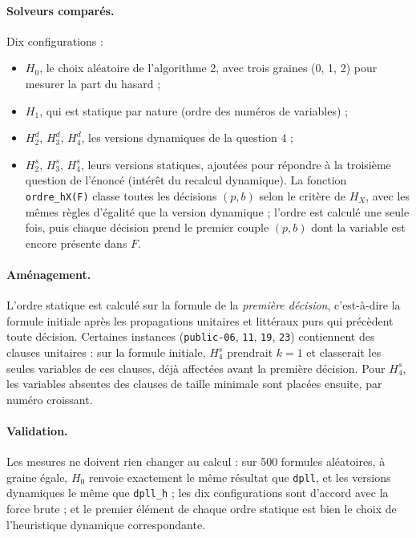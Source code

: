 \documentclass[11pt,a4paper]{article}
\begin{document}
\paragraph{Solveurs comparés.} Dix configurations :
\begin{itemize}
  \item $H_0$, le choix aléatoire de l'algorithme 2, avec trois graines (0, 1, 2) pour mesurer
        la part du hasard ;
  \item $H_1$, qui est statique par nature (ordre des numéros de variables) ;
  \item $H_2^d$, $H_3^d$, $H_4^d$, les versions dynamiques de la question 4 ;
  \item $H_2^s$, $H_3^s$, $H_4^s$, leurs versions statiques, ajoutées pour répondre à la
        troisième question de l'énoncé (intérêt du recalcul dynamique). La fonction
        \texttt{ordre\_hX(F)} classe toutes les décisions $(p,b)$ selon le critère de $H_X$,
        avec les mêmes règles d'égalité que la version dynamique ; l'ordre est calculé une seule
        fois, puis chaque décision prend le premier couple $(p,b)$ dont la variable est encore
        présente dans $F$.
\end{itemize}

\paragraph{Aménagement.} L'ordre statique est calculé sur la formule de la \emph{première
décision}, c'est-à-dire la formule initiale après les propagations unitaires et littéraux purs
qui précèdent toute décision. Certaines instances (\texttt{public-06}, \texttt{11}, \texttt{19},
\texttt{23}) contiennent des clauses unitaires : sur la formule initiale, $H_4^s$ prendrait
$k=1$ et classerait les seules variables de ces clauses, déjà affectées avant la première
décision. Pour $H_4^s$, les variables absentes des clauses de taille minimale sont placées
ensuite, par numéro croissant.

\paragraph{Validation.} Les mesures ne doivent rien changer au calcul : sur 500 formules
aléatoires, à graine égale, $H_0$ renvoie exactement le même résultat que \texttt{dpll}, et les
versions dynamiques le même que \texttt{dpll\_h} ; les dix configurations sont d'accord avec la
force brute ; et le premier élément de chaque ordre statique est bien le choix de l'heuristique
dynamique correspondante.
\end{document}
